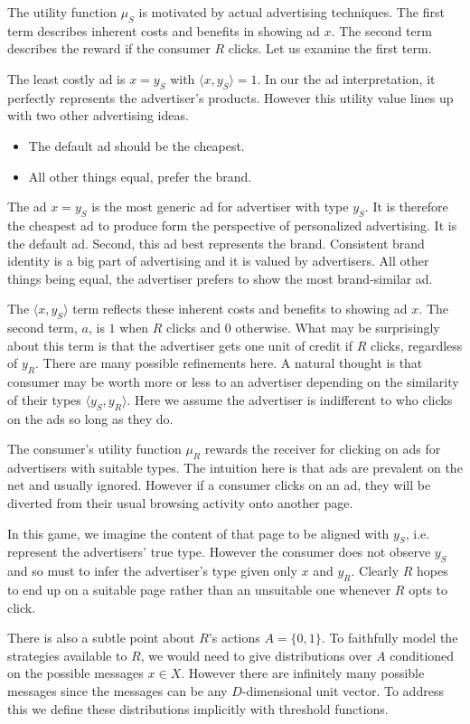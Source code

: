 \documentclass{article}
\begin{document}
The utility function $\mu_S$ is motivated by actual advertising techniques. The first term describes inherent costs and benefits in showing ad $x$. The second term describes the reward if the consumer $R$ clicks. Let us examine the first term.

The least costly ad is $x = y_S$ with $\langle x, y_S \rangle = 1$. In our the ad interpretation, it perfectly represents the advertiser's products. However this utility value lines up with two other advertising ideas.
\begin{itemize}
\item The default ad should be the cheapest.
\item All other things equal, prefer the brand.
\end{itemize}
The ad $x = y_S$ is the most generic ad for advertiser with type $y_S$. It is therefore the cheapest ad to produce form the perspective of personalized advertising. It is the default ad. Second, this ad best represents the brand. Consistent brand identity is a big part of advertising and it is valued by advertisers. All other things being equal, the advertiser prefers to show the most brand-similar ad.

The $\langle x, y_S \rangle$ term reflects these inherent costs and benefits to showing ad $x$. The second term, $a$, is $1$ when $R$ clicks and $0$ otherwise. What may be surprisingly about this term is that the advertiser gets one unit of credit if $R$ clicks, regardless of $y_R$. There are many possible refinements here. A natural thought is that consumer may be worth more or less to an advertiser depending on the similarity of their types $\langle y_S, y_R \rangle$. Here we assume the advertiser is indifferent to who clicks on the ads so long as they do. 

The consumer's utility function $\mu_R$ rewards the receiver for clicking on ads for advertisers with suitable types. The intuition here is that ads are prevalent on the net and usually ignored. However if a consumer clicks on an ad, they will be diverted from their usual browsing activity onto another page.

In this game, we imagine the content of that page to be aligned with $y_S$, i.e. represent the advertisers' true type. However the consumer does not observe $y_S$ and so must to infer the advertiser's type given only $x$ and $y_R$. Clearly $R$ hopes to end up on a suitable page rather than an unsuitable one whenever $R$ opts to click.

There is also a subtle point about $R$'s actions $A=\lbrace 0, 1\rbrace$. To faithfully model the strategies available to $R$, we would need to give distributions over $A$ conditioned on the possible messages $x \in X$. However there are infinitely many possible messages since the messages can be any $D$-dimensional unit vector. To address this we define these distributions implicitly with threshold functions.
\end{document}
